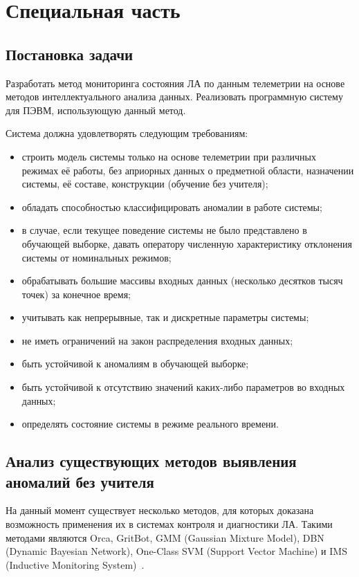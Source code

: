 \chapter{Специальная часть}
\section{Постановка задачи}
\label{sec:spec:ProblemDefinition}
Разработать метод мониторинга состояния ЛА по данным телеметрии на основе методов интеллектуального анализа данных. Реализовать программную систему для ПЭВМ, использующую данный метод.

Система должна удовлетворять следующим требованиям:
\begin{itemize}
	\item строить модель системы только на основе телеметрии при различных режимах её работы, без априорных данных о предметной области, назначении системы, её составе, конструкции (обучение без учителя);
	\item обладать способностью классифицировать аномалии в работе системы;
	\item в случае, если текущее поведение системы не было представлено в обучающей выборке, давать оператору численную характеристику отклонения системы от номинальных режимов;
	\item обрабатывать большие массивы входных данных (несколько десятков тысяч точек) за конечное время;
	\item учитывать как непрерывные, так и дискретные параметры системы;
	\item не иметь ограничений на закон распределения входных данных;
	\item быть устойчивой к аномалиям в обучающей выборке;
	\item быть устойчивой к отсутствию значений каких-либо параметров во входных данных;
	\item определять состояние системы в режиме реального времени.
\end{itemize}

\section{Анализ существующих методов выявления аномалий без учителя}
На данный момент существует несколько методов, для которых доказана возможность применения их в системах контроля и диагностики ЛА. Такими методами являются Orca, GritBot, GMM (Gaussian Mixture Model), DBN (Dynamic Bayesian Network), One-Class SVM (Support Vector Machine) и IMS (Inductive Monitoring System)~\cite{MartinCompUnsupervisedDetectionMethods}.

